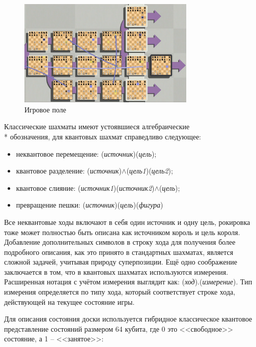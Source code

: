 \begin{figure}[h!btp]
	\centering
	\includegraphics[width=0.75\textwidth]{inc/chess.png}
	\caption{Игровое поле}
	\label{fig:chess}
\end{figure}

Классические шахматы имеют устоявшиеся алгебраические \\* обозначения\cite{fide}, для квантовых шахмат справедливо следующее:

\begin{itemize}[label=---]
	\item неквантовое перемещение: (\textit{источник})(\textit{цель});
	\item квантовое разделение: (\textit{источник})$\wedge$(\textit{цель1})(\textit{цель2});
	\item квантовое слияние: (\textit{источник1})(\textit{источник2})$\wedge$(\textit{цель});
	\item превращение пешки: (\textit{источник})(\textit{цель})(\textit{фигура})
\end{itemize}

Все неквантовые ходы включают в себя один источник и одну цель, рокировка тоже может полностью быть описана как источником король и цель короля. Добавление дополнительных символов в строку хода для получения более подробного описания, как это принято в стандартных шахматах, является сложной задачей, учитывая природу суперпозиции. Ещё одно соображение заключается в том, что в квантовых шахматах используются измерения. Расширенная нотация с учётом измерения выглядит как: (\textit{ход}).(\textit{измерение}). Тип измерения определяется по типу хода, который соответствует строке хода, действующей на текущее состояние игры.

Для описания состояния доски используется гибридное классическое квантовое представление состояний размером 64 кубита, где 0 это <<свободное>> состояние, а 1 -- <<занятое>>:

